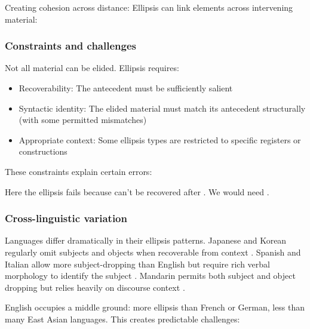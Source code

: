 Creating cohesion across distance: Ellipsis can link elements across intervening material:

\z

\subsubsection*{Constraints and challenges}

Not all material can be elided. Ellipsis requires:
\begin{itemize}[noitemsep]
\item Recoverability: The antecedent must be sufficiently salient 
\item Syntactic identity: The elided material must match its antecedent structurally (with some permitted mismatches) 
\item Appropriate context: Some ellipsis types are restricted to specific registers or constructions 
\end{itemize}

These constraints explain certain errors:

\z
Here the ellipsis fails because  can't be recovered after . We would need .

\subsubsection*{Cross-linguistic variation}

Languages differ dramatically in their ellipsis patterns. Japanese and Korean regularly omit subjects and objects when recoverable from context \citep{Kuno1973}. Spanish and Italian allow more subject-dropping than English but require rich verbal morphology to identify the subject \citep{JaeggliSafir1989}. Mandarin permits both subject and object dropping but relies heavily on discourse context \citep{li_thompson_1979}.

English occupies a middle ground: more ellipsis than French or German, less than many East Asian languages. This creates predictable challenges:

